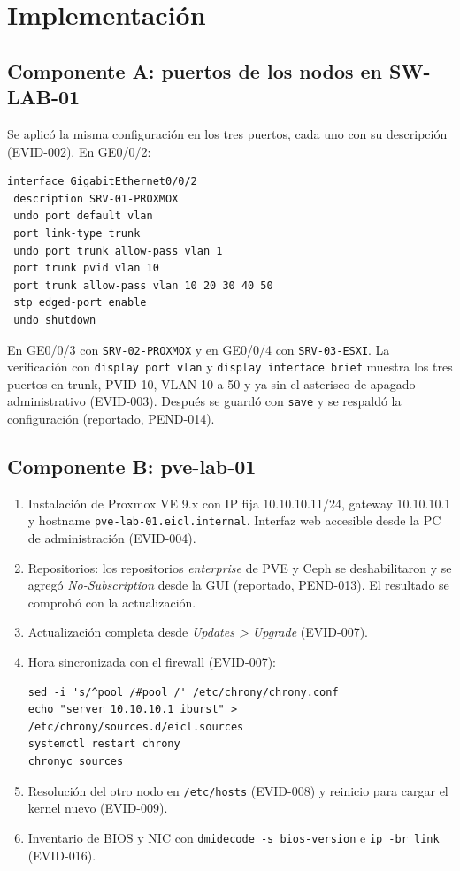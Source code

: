 \documentclass[11pt,a4paper]{article}
\begin{document}
\section{Implementación}
\subsection{Componente A: puertos de los nodos en SW-LAB-01}
Se aplicó la misma configuración en los tres puertos, cada uno con su descripción (EVID-002). En GE0/0/2:

\begin{lstlisting}
interface GigabitEthernet0/0/2
 description SRV-01-PROXMOX
 undo port default vlan
 port link-type trunk
 undo port trunk allow-pass vlan 1
 port trunk pvid vlan 10
 port trunk allow-pass vlan 10 20 30 40 50
 stp edged-port enable
 undo shutdown
\end{lstlisting}

En GE0/0/3 con \texttt{SRV-02-PROXMOX} y en GE0/0/4 con \texttt{SRV-03-ESXI}. La verificación con \texttt{display port vlan} y \texttt{display interface brief} muestra los tres puertos en trunk, PVID 10, VLAN 10 a 50 y ya sin el asterisco de apagado administrativo (EVID-003). Después se guardó con \texttt{save} y se respaldó la configuración (reportado, PEND-014).

\subsection{Componente B: pve-lab-01}
\begin{enumerate}
  \item Instalación de Proxmox VE 9.x con IP fija 10.10.10.11/24, gateway 10.10.10.1 y hostname \texttt{pve-lab-01.eicl.internal}. Interfaz web accesible desde la PC de administración (EVID-004).
  \item Repositorios: los repositorios \emph{enterprise} de PVE y Ceph se deshabilitaron y se agregó \emph{No-Subscription} desde la GUI (reportado, PEND-013). El resultado se comprobó con la actualización.
  \item Actualización completa desde \emph{Updates > Upgrade} (EVID-007).
  \item Hora sincronizada con el firewall (EVID-007):
\begin{lstlisting}
sed -i 's/^pool /#pool /' /etc/chrony/chrony.conf
echo "server 10.10.10.1 iburst" > /etc/chrony/sources.d/eicl.sources
systemctl restart chrony
chronyc sources
\end{lstlisting}
  \item Resolución del otro nodo en \texttt{/etc/hosts} (EVID-008) y reinicio para cargar el kernel nuevo (EVID-009).
  \item Inventario de BIOS y NIC con \texttt{dmidecode -s bios-version} e \texttt{ip -br link} (EVID-016).
\end{enumerate}
\end{document}
